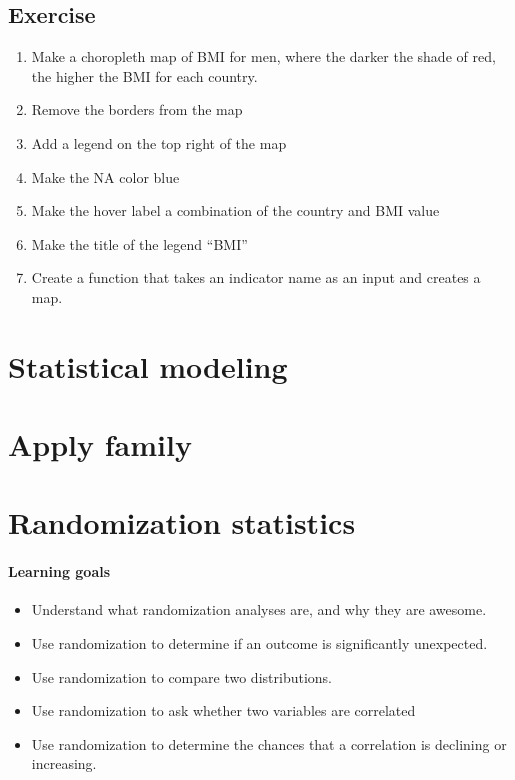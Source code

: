 \documentclass[
]{book}
\providecommand{\tightlist}{%
  \setlength{\itemsep}{0pt}\setlength{\parskip}{0pt}}
\begin{document}
\hypertarget{exercise-10}{%
\section*{Exercise}\label{exercise-10}}

\begin{enumerate}
\def\labelenumi{\arabic{enumi}.}
\item
  Make a choropleth map of BMI for men, where the darker the shade of red, the higher the BMI for each country.
\item
  Remove the borders from the map
\item
  Add a legend on the top right of the map
\item
  Make the NA color blue
\item
  Make the hover label a combination of the country and BMI value
\item
  Make the title of the legend ``BMI''
\item
  Create a function that takes an indicator name as an input and creates a map.
\end{enumerate}

\hypertarget{statistical-modeling}{%
\chapter{Statistical modeling}\label{statistical-modeling}}

\hypertarget{apply-family}{%
\chapter{Apply family}\label{apply-family}}

\hypertarget{randomization-statistics}{%
\chapter{Randomization statistics}\label{randomization-statistics}}

\hypertarget{learning-goals-25}{%
\subsubsection*{Learning goals}\label{learning-goals-25}}

\begin{itemize}
\tightlist
\item
  Understand what randomization analyses are, and why they are awesome.
\item
  Use randomization to determine if an outcome is significantly unexpected.
\item
  Use randomization to compare two distributions.
\item
  Use randomization to ask whether two variables are correlated
\item
  Use randomization to determine the chances that a correlation is declining or increasing.
\end{itemize}
\end{document}
